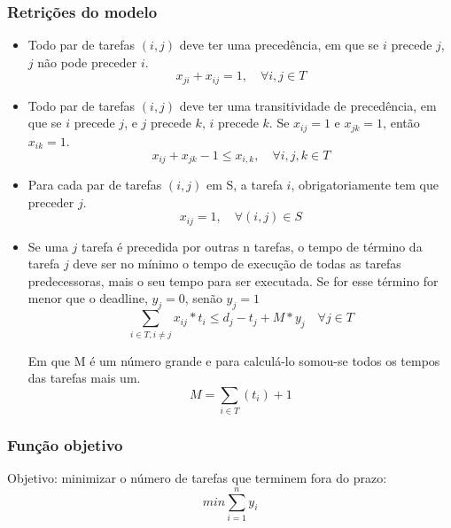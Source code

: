 \documentclass[11pt,letterpaper]{article}
\begin{document}
\subsubsection*{Retrições do modelo}
\begin{itemize}

\item Todo par de tarefas $(i,j)$ deve ter uma precedência, em que se $i$
  precede $j$, $j$ não pode preceder $i$. 
\begin{equation*}
  x_{ji}+x_{ij}=1, \quad\forall i,j \in T
\end{equation*}

\item Todo par de tarefas $(i,j)$ deve ter uma transitividade de precedência, em que se $i$
  precede $j$, e $j$ precede $k$, $i$ precede $k$. Se $x_{ij}=1$ e
  $x_{jk}=1$, então $x_{ik}=1$.
\begin{equation*}
  x_{ij}+x_{jk}-1 \leq x_{i,k}, \quad \forall i,j,k \in T
\end{equation*}


\item Para cada par de tarefas $(i,j)$ em S, a tarefa $i$,
  obrigatoriamente tem que preceder $j$. 
\begin{equation*}
  x_{ij} = 1,\quad \forall (i,j) \in S
\end{equation*}

\item Se uma $j$ tarefa é precedida por outras n tarefas, o tempo de
  término da tarefa $j$ deve ser no mínimo o tempo de execução de todas
  as tarefas predecessoras, mais o seu tempo para ser executada. Se
  for esse término for menor que o deadline, $y_{j}=0$, senão $y_{j}=1$ 
\begin{equation*}
 \sum_{i \in T, i \neq j} x_{ij}*t_{i} \leq d_{j}-t_{j}+ M*y_{j}\quad \forall j \in T
\end{equation*}
 
Em que M é um número grande e para calculá-lo somou-se todos os tempos
das tarefas mais um. 
\begin{equation*}
 M = \sum_{i \in T} (t_{i}) +1
\end{equation*}
 
\end{itemize}

\subsubsection*{Função objetivo}
Objetivo: minimizar o número de tarefas que terminem fora do prazo:
\begin{equation}
min\sum_{i=1}^{n}y_i
\end{equation}
\end{document}
